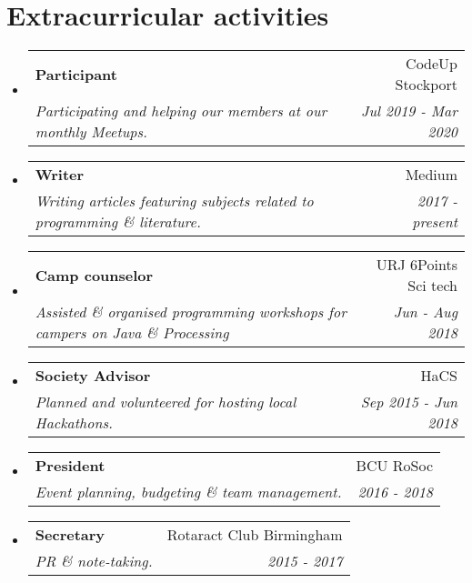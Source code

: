 \documentclass[12pt]{article}
\makeatletter
\newcommand{\resumeSubheading}[4]{
  \vspace{-1pt}\item
    \begin{tabular*}{0.97\textwidth}[t]{l@{\extracolsep{\fill}}r}
      \textbf{#1} & #2 \\
      \textit{\small#3} & \textit{\small #4} \\
    \end{tabular*}\vspace{-5pt}
}
\newcommand{\resumeSubHeadingListStart}{\begin{itemize}[leftmargin=*]}
\newcommand{\resumeSubHeadingListEnd}{\end{itemize}}
\makeatother
\begin{document}
 \section{Extracurricular activities}
    \resumeSubHeadingListStart
         \resumeSubheading
        {Participant} {CodeUp Stockport}
        {Participating and helping our members at our monthly Meetups.}{Jul 2019 - Mar 2020}
        \resumeSubheading
        {Writer}{Medium}
        {Writing articles featuring subjects related to programming \& literature.}
        {2017 - present}
          \resumeSubheading
        {Camp counselor}{URJ 6Points Sci tech}
        {Assisted \& organised programming workshops for campers on Java \& Processing}
        {Jun - Aug 2018}
         \resumeSubheading
        {Society Advisor}
        {HaCS}
        {Planned and volunteered for hosting local Hackathons.}
        {Sep 2015 - Jun 2018}
        \resumeSubheading
        {President}
        {BCU RoSoc}
        {Event planning, budgeting \& team management.}{2016 - 2018}
        \resumeSubheading
        {Secretary}
        {Rotaract Club Birmingham}
        {PR \& note-taking.}{2015 - 2017}
\resumeSubHeadingListEnd

\end{document}
